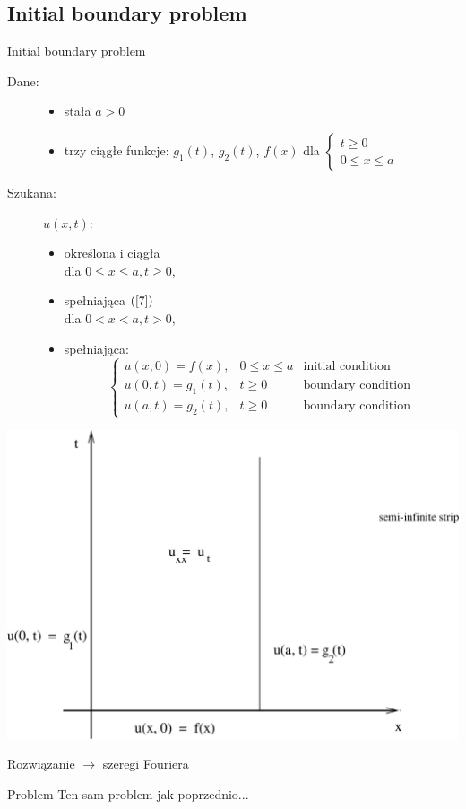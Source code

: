 \subsection{Initial boundary problem}

\begin{frame}{Initial boundary problem}
  \begin{description}
    \item[Dane:]
      \begin{itemize}
        \item stała $a>0$
        \item trzy ciągłe funkcje: $g_1(t)$, $g_2(t)$, $f(x)$ dla $ \left\{ \begin{array}{l} t \ge 0 \\ 0 \le x \le a \end{array} \right. $
      \end{itemize}
    \item[Szukana:]
      $u(x,t)$:
      \begin{itemize}
        \item określona i ciągła \\ dla $0 \le x \le a, t \ge 0$,
        \item spełniająca $(\ref{7})$ \\ dla $0 < x < a, t > 0$,
        \item spełniająca:
        $$ \left\{ \begin{array}{lrl}
        u(x,0) = f(x), & 0 \le x \le a & \text{initial condition} \\
        u(0,t) = g_1(t), & t \ge 0 & \text{boundary condition} \\
        u(a,t) = g_2(t), & t \ge 0 & \text{boundary condition}
        \end{array} \right. $$
      \end{itemize}
  \end{description}
\end{frame}

\begin{frame}
  \centerline{\includegraphics[height = 0.85 \textheight]{img/23/ibp}}
\end{frame}

\begin{frame}
  Rozwiązanie $\rightarrow$ szeregi Fouriera

  \begin{alertblock}{Problem}
    Ten sam problem jak poprzednio...
  \end{alertblock}
\end{frame}
